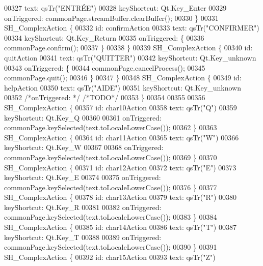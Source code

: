 \begin{DoxyCode}
00327         text: qsTr(\textcolor{stringliteral}{"ENTRÉE"})
00328         keyShortcut: Qt.Key\_Enter
00329         onTriggered: commonPage.streamBuffer.clearBuffer();
00330     \}
00331     SH\_ComplexAction \{
00332         \textcolor{keywordtype}{id}: confirmAction
00333         text: qsTr(\textcolor{stringliteral}{"CONFIRMER"})
00334         keyShortcut: Qt.Key\_Return
00335         onTriggered: \{
00336             commonPage.confirm();
00337         \}
00338     \}
00339     SH\_ComplexAction \{
00340         \textcolor{keywordtype}{id}: quitAction
00341         text: qsTr(\textcolor{stringliteral}{"QUITTER"})
00342         keyShortcut: Qt.Key\_unknown
00343         onTriggered: \{
00344             commonPage.cancelProcess();
00345             commonPage.quit();
00346         \}
00347     \}
00348     SH\_ComplexAction \{
00349         \textcolor{keywordtype}{id}: helpAction
00350         text: qsTr(\textcolor{stringliteral}{"AIDE"})
00351         keyShortcut: Qt.Key\_unknown
00352         \textcolor{comment}{/*onTriggered: */} \textcolor{comment}{/*TODO*/}
00353     \}
00354 
00355 
00356     SH\_ComplexAction \{
00357         \textcolor{keywordtype}{id}: char10Action
00358         text: qsTr(\textcolor{stringliteral}{"Q"})
00359         keyShortcut: Qt.Key\_Q
00360 
00361         onTriggered: commonPage.keySelected(text.toLocaleLowerCase());
00362     \}
00363     SH\_ComplexAction \{
00364         \textcolor{keywordtype}{id}: char11Action
00365         text: qsTr(\textcolor{stringliteral}{"W"})
00366         keyShortcut: Qt.Key\_W
00367 
00368         onTriggered: commonPage.keySelected(text.toLocaleLowerCase());
00369     \}
00370     SH\_ComplexAction \{
00371         \textcolor{keywordtype}{id}: char12Action
00372         text: qsTr(\textcolor{stringliteral}{"E"})
00373         keyShortcut: Qt.Key\_E
00374 
00375         onTriggered: commonPage.keySelected(text.toLocaleLowerCase());
00376     \}
00377     SH\_ComplexAction \{
00378         \textcolor{keywordtype}{id}: char13Action
00379         text: qsTr(\textcolor{stringliteral}{"R"})
00380         keyShortcut: Qt.Key\_R
00381 
00382         onTriggered: commonPage.keySelected(text.toLocaleLowerCase());
00383     \}
00384     SH\_ComplexAction \{
00385         \textcolor{keywordtype}{id}: char14Action
00386         text: qsTr(\textcolor{stringliteral}{"T"})
00387         keyShortcut: Qt.Key\_T
00388 
00389         onTriggered: commonPage.keySelected(text.toLocaleLowerCase());
00390     \}
00391     SH\_ComplexAction \{
00392         \textcolor{keywordtype}{id}: char15Action
00393         text: qsTr(\textcolor{stringliteral}{"Z"})

\end{DoxyCode}
